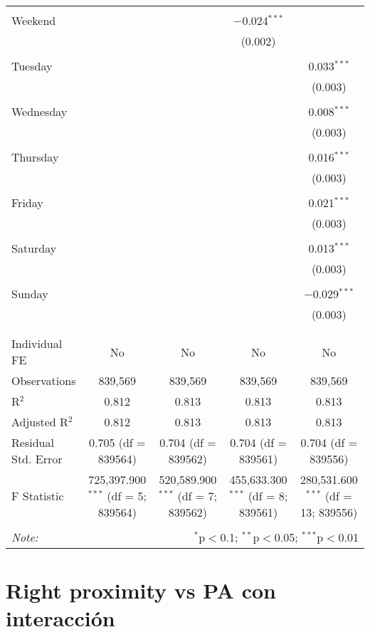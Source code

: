 \documentclass[
]{article}
\begin{document}
\begin{table}[!htbp]
{\begin{tabular}{@{\extracolsep{5pt}}lcccc}
  & & & & \\ 
 Weekend &  &  & $-$0.024$^{***}$ &  \\ 
  &  &  & (0.002) &  \\ 
  & & & & \\ 
 Tuesday &  &  &  & 0.033$^{***}$ \\ 
  &  &  &  & (0.003) \\ 
  & & & & \\ 
 Wednesday &  &  &  & 0.008$^{***}$ \\ 
  &  &  &  & (0.003) \\ 
  & & & & \\ 
 Thursday &  &  &  & 0.016$^{***}$ \\ 
  &  &  &  & (0.003) \\ 
  & & & & \\ 
 Friday &  &  &  & 0.021$^{***}$ \\ 
  &  &  &  & (0.003) \\ 
  & & & & \\ 
 Saturday &  &  &  & 0.013$^{***}$ \\ 
  &  &  &  & (0.003) \\ 
  & & & & \\ 
 Sunday &  &  &  & $-$0.029$^{***}$ \\ 
  &  &  &  & (0.003) \\ 
  & & & & \\ 
\hline \\[-1.8ex] 
Individual FE & No & No & No & No \\ 
Observations & 839,569 & 839,569 & 839,569 & 839,569 \\ 
R$^{2}$ & 0.812 & 0.813 & 0.813 & 0.813 \\ 
Adjusted R$^{2}$ & 0.812 & 0.813 & 0.813 & 0.813 \\ 
Residual Std. Error & 0.705 (df = 839564) & 0.704 (df = 839562) & 0.704 (df = 839561) & 0.704 (df = 839556) \\ 
F Statistic & 725,397.900$^{***}$ (df = 5; 839564) & 520,589.900$^{***}$ (df = 7; 839562) & 455,633.300$^{***}$ (df = 8; 839561) & 280,531.600$^{***}$ (df = 13; 839556) \\ 
\hline 
\hline \\[-1.8ex] 
\textit{Note:}  & \multicolumn{4}{r}{$^{*}$p$<$0.1; $^{**}$p$<$0.05; $^{***}$p$<$0.01} \\ 
\end{tabular}
} 
\end{table} 
\newpage
\section{Right proximity vs PA con interacción}
\end{document}
